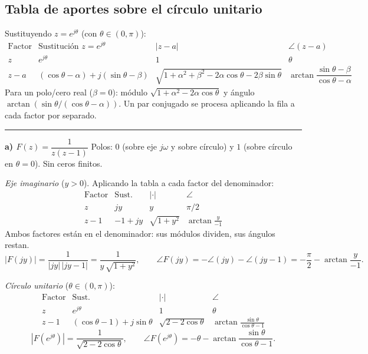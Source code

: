 \documentclass[10pt,a4paper]{article}
\begin{document}
\subsection*{Tabla de aportes sobre el círculo unitario}

Sustituyendo $z=e^{j\theta}$ (con $\theta\in(0,\pi)$):
\[
	\renewcommand{\arraystretch}{1.5}
	\begin{array}{l|c|c|c}
	\text{Factor} & \text{Sustitución }z=e^{j\theta} & |z-a| & \angle(z-a) \\\hline
	z            & e^{j\theta}                                 & 1                                                       & \theta \\
	z-a          & (\cos\theta-\alpha)+j(\sin\theta-\beta)     & \sqrt{1+\alpha^2+\beta^2-2\alpha\cos\theta-2\beta\sin\theta} & \arctan\!\dfrac{\sin\theta-\beta}{\cos\theta-\alpha}
	\end{array}
\]
Para un polo/cero real ($\beta=0$): módulo $\sqrt{1+\alpha^2-2\alpha\cos\theta}$ y ángulo $\arctan(\sin\theta/(\cos\theta-\alpha))$. Un par conjugado se procesa aplicando la fila a cada factor por separado.

\bigskip\hrule\bigskip

\noindent\textbf{a) $F(z)=\dfrac{1}{z(z-1)}$}\;\textemdash\; Polos: $0$ (sobre eje $j\omega$ y sobre círculo) y $1$ (sobre círculo en $\theta=0$). Sin ceros finitos.

\medskip
\noindent\textit{Eje imaginario} ($y>0$). Aplicando la tabla a cada factor del denominador:
\[
	\renewcommand{\arraystretch}{1.3}
	\begin{array}{l|c|c|c}
	\text{Factor} & \text{Sust.} & |\cdot| & \angle \\\hline
	z   & jy     & y            & \pi/2 \\
	z-1 & -1+jy  & \sqrt{1+y^2} & \arctan\tfrac{y}{-1}
	\end{array}
\]
Ambos factores están en el denominador: sus módulos dividen, sus ángulos restan.
\[
	|F(jy)| = \frac{1}{|jy|\,|jy-1|} = \frac{1}{y\,\sqrt{1+y^2}},\qquad
	\angle F(jy) = -\angle(jy) - \angle(jy-1) = -\frac{\pi}{2} - \arctan\!\frac{y}{-1}.
\]

\medskip
\noindent\textit{Círculo unitario} ($\theta\in(0,\pi)$):
\[
	\renewcommand{\arraystretch}{1.3}
	\begin{array}{l|c|c|c}
	\text{Factor} & \text{Sust.} & |\cdot| & \angle \\\hline
	z   & e^{j\theta}                & 1                    & \theta \\
	z-1 & (\cos\theta-1)+j\sin\theta & \sqrt{2-2\cos\theta} & \arctan\tfrac{\sin\theta}{\cos\theta-1}
	\end{array}
\]
\[
	|F(e^{j\theta})| = \frac{1}{\sqrt{2-2\cos\theta}},\qquad
	\angle F(e^{j\theta}) = -\theta - \arctan\!\frac{\sin\theta}{\cos\theta-1}.
\]
\end{document}

